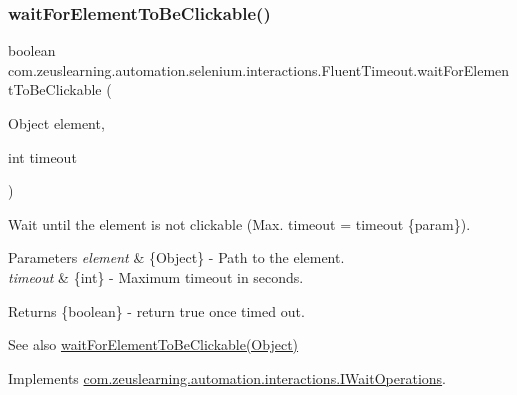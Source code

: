 \subsubsection{\texorpdfstring{wait\+For\+Element\+To\+Be\+Clickable()}{waitForElementToBeClickable()}\hspace{0.1cm}{\footnotesize\ttfamily [2/2]}}
{\footnotesize\ttfamily boolean com.\+zeuslearning.\+automation.\+selenium.\+interactions.\+Fluent\+Timeout.\+wait\+For\+Element\+To\+Be\+Clickable (\begin{DoxyParamCaption}\item[{Object}]{element,  }\item[{int}]{timeout }\end{DoxyParamCaption})\hspace{0.3cm}{\ttfamily [inline]}}

Wait until the element is not clickable (Max. timeout = timeout \{param\}).


\begin{DoxyParams}{Parameters}
{\em element} & \{Object\} -\/ Path to the element. \\
\hline
{\em timeout} & \{int\} -\/ Maximum timeout in seconds.\\
\hline
\end{DoxyParams}
\begin{DoxyReturn}{Returns}
\{boolean\} -\/ return {\ttfamily true} once timed out.
\end{DoxyReturn}
\begin{DoxySeeAlso}{See also}
\hyperlink{classcom_1_1zeuslearning_1_1automation_1_1selenium_1_1interactions_1_1FluentTimeout_ad9a51efbd23459b848e9640fe0f9a3db}{wait\+For\+Element\+To\+Be\+Clickable(\+Object)} 
\end{DoxySeeAlso}


Implements \hyperlink{interfacecom_1_1zeuslearning_1_1automation_1_1interactions_1_1IWaitOperations_a8b6cc8c4332c681818630d1665f79c44}{com.\+zeuslearning.\+automation.\+interactions.\+I\+Wait\+Operations}.

\hypertarget{classcom_1_1zeuslearning_1_1automation_1_1selenium_1_1interactions_1_1FluentTimeout_a83338a2e6ff1028ec988d6122e4afeab}{}\label{classcom_1_1zeuslearning_1_1automation_1_1selenium_1_1interactions_1_1FluentTimeout_a83338a2e6ff1028ec988d6122e4afeab} 
